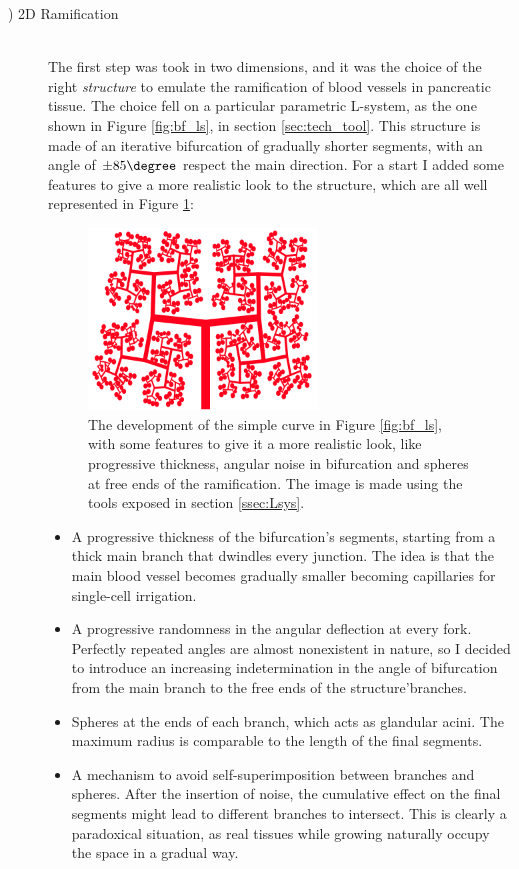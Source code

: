 \begin{description}
    \item [\mycount) 2D Ramification] \hfill \\
    The first step was took in two dimensions, and it was the choice of the right \textit{structure} to emulate the ramification of blood vessels in pancreatic tissue. The choice fell on a particular parametric L-system, as the one shown in Figure \ref{fig:bf_ls}, in section \ref{sec:tech_tool}. This structure is made of an iterative bifurcation of gradually shorter segments, with an angle of $\pm 85 \degree$ respect the main direction. For a start I added some features to give a more realistic look to the structure, which are all well represented in Figure \ref{fig:ram_feat}:

    \begin{figure}
        \centering
        \includegraphics[width = 0.6\textwidth]{images/ram_feat}
        \caption{The development of the simple curve in Figure \ref{fig:bf_ls}, with some features to give it a more realistic look, like progressive thickness, angular noise in bifurcation and spheres at free ends of the ramification. The image is made using the tools exposed in section \ref{ssec:Lsys}.}
        \label{fig:ram_feat}
    \end{figure}

    \begin{itemize}
        \item A progressive thickness of the bifurcation's segments, starting from a thick main branch that dwindles every junction. The idea is that the main blood vessel becomes gradually smaller becoming capillaries for single-cell irrigation.
        \item A progressive randomness in the angular deflection at every fork. Perfectly repeated angles are almost nonexistent in nature, so I decided to introduce an increasing indetermination in the angle of bifurcation from the main branch to the free ends of the structure'branches.
        \item Spheres at the ends of each branch, which acts as glandular acini. The maximum radius is comparable to the length of the final segments.
        \item A mechanism to avoid self-superimposition between branches and spheres. After the insertion of noise, the cumulative effect on the final segments might lead to different branches to intersect. This is clearly a paradoxical situation, as real tissues while growing naturally occupy the space in a gradual way.
    \end{itemize}


\end{description}
